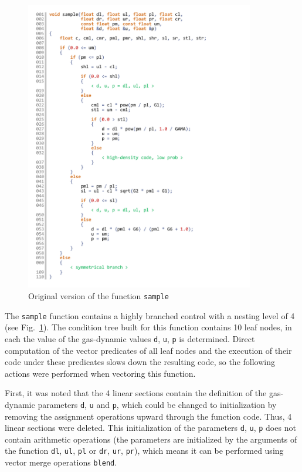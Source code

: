 \documentclass[utf8,english]{psta}%
\begin{document}
\begin{figure}
\includegraphics[width=10cm]{pics/pic_sample_code_4}
\caption{Original version of the function \texttt{sample}}
\label{pic:sample_code_4}
\end{figure}

The \texttt{sample} function contains a highly branched control with a nesting level of 4 (see Fig.~\ref{pic:sample_code_4}).
The condition tree built for this function contains 10 leaf nodes, in each the value of the gas-dynamic values \texttt{d}, \texttt{u}, \texttt{p} is determined.
Direct computation of the vector predicates of all leaf nodes and the execution of their code under these predicates slows down the resulting code, so the following actions were performed when vectoring this function.

First, it was noted that the 4 linear sections contain the definition of the gas-dynamic parameters \texttt{d}, \texttt{u} and \texttt{p}, which could be changed to initialization by removing the assignment operations upward through the function code.
Thus, 4 linear sections were deleted.
This initialization of the parameters \texttt{d}, \texttt{u}, \texttt{p} does not contain arithmetic operations (the parameters are initialized by the arguments of the function \texttt{dl}, \texttt{ul}, \texttt{pl} or \texttt{dr}, \texttt{ur}, \texttt{pr}), which means it can be performed using vector merge operations \texttt{blend}.
\end{document}
